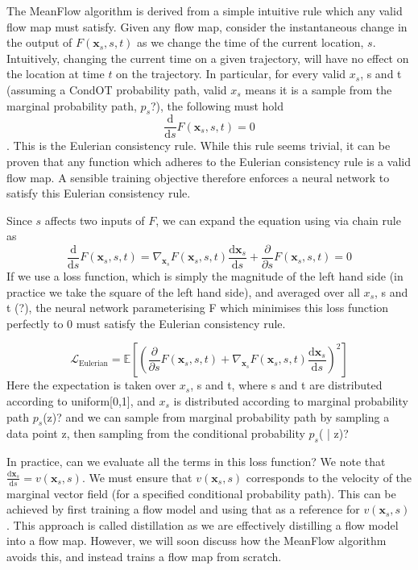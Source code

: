 \documentclass[12pt,a4paper]{report}
\begin{document}
The MeanFlow algorithm is derived from a simple intuitive rule which any valid flow map must satisfy.  
Given any flow map, consider the instantaneous change in the output of $F(\mathbf{x}_s, s, t)$ as we change the time of the current location, $s$. 
Intuitively, changing the current time on a given trajectory, will have no effect on the location at time $t$ on the trajectory. In particular, for every valid $x_s$, s and t (assuming a CondOT probability path, valid $x_s$ means it is a sample from the marginal probability path, $p_s$?), the following must hold 
    $$\frac{\mathrm{d}}{\mathrm{d}s} F(\mathbf{x}_s, s, t) = 0$$. 
This is the Eulerian consistency rule. 
While this rule seems trivial, it can be proven that any function which adheres to the Eulerian consistency rule is a valid flow map.
A sensible training objective therefore enforces a neural network to satisfy this Eulerian consistency rule. 

Since $s$ affects two inputs of $F$, we can expand the equation using via chain rule as
\begin{equation}
\label{eq:eularian_consistency_eq}
    \frac{\mathrm{d}}{\mathrm{d}s} F(\mathbf{x}_s, s, t) = \nabla_{\mathbf{x}_s} F(\mathbf{x}_s, s, t) \frac{\mathrm{d}\mathbf{x}_s}{\mathrm{d}s} + \frac{\partial}{\partial s} F(\mathbf{x}_s, s, t) = 0
\end{equation}
If we use a loss function, which is simply the magnitude of the left hand side (in practice we take the square of the left hand side), and averaged over all $x_s$, s and t (?), the neural network parameterising F which minimises this loss function perfectly to 0 must satisfy the Eulerian consistency rule.  

\begin{equation}
\label{eq:basic_eulerian_loss}
    \mathcal{L}_{\text{Eulerian}} = \mathbb{E} \left[ \left( \frac{\partial}{\partial s} F(\mathbf{x}_s, s, t) + \nabla_{\mathbf{x}_s} F(\mathbf{x}_s, s, t) \frac{\mathrm{d}\mathbf{x}_s}{\mathrm{d}s}  \right)^2 \right]
\end{equation}
Here the expectation is taken over $x_s$, s and t, where s and t are distributed according to uniform[0,1], and $x_s$ is distributed according to marginal probability path $p_s$(z)? and we can sample from marginal probability path by sampling a data point z, then sampling from the conditional probability $p_s$( | z)?

In practice, can we evaluate all the terms in this loss function?
We note that $\frac{\mathrm{d}\mathbf{x}_s}{\mathrm{d}s} = v(\mathbf{x}_s, s)$. 
We must ensure that $v(\mathbf{x}_s, s)$ corresponds to the velocity of the marginal vector field (for a specified conditional probability path). 
This can be achieved by first training a flow model and using that as a reference for $v(\mathbf{x}_s, s)$. This approach is called distillation as we are effectively distilling a flow model into a flow map. 
However, we will soon discuss how the MeanFlow algorithm avoids this, and instead trains a flow map from scratch. 
\end{document}
